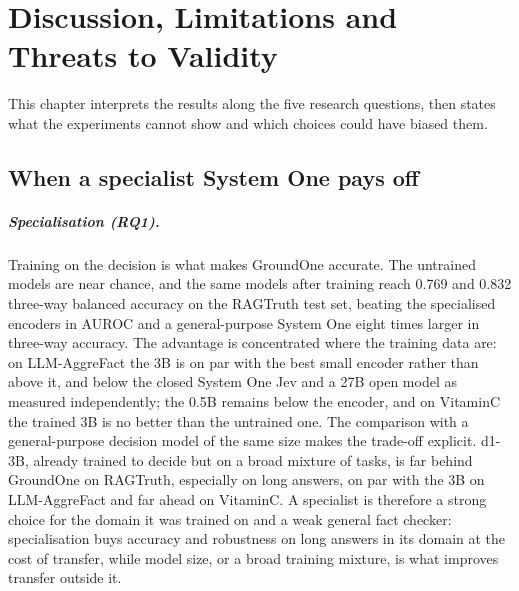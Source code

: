 \chapter{Discussion, Limitations and Threats to Validity}
\label{sec:discussion}


This chapter interprets the results along the five research questions, then states what the experiments cannot show
and which choices could have biased them.

\section{When a specialist System One pays off}
\label{sec:disc-synthesis}

\paragraph{Specialisation (RQ1).} Training on the decision is what makes GroundOne accurate. The untrained models are
near chance, and the same models after training reach 0.769 and 0.832 three-way balanced accuracy on the RAGTruth test
set, beating the specialised encoders in AUROC and a general-purpose System One eight times larger in three-way accuracy.
The advantage is concentrated where the training data are: on LLM-AggreFact the 3B is on par with the best small encoder
rather than above it, and below the closed System One Jev and a 27B open model as measured independently; the 0.5B
remains below the encoder, and on VitaminC the trained 3B is no better than the untrained one. The comparison with a general-purpose decision model of the same size makes the trade-off explicit. d1-3B, already
trained to decide but on a broad mixture of tasks, is far behind GroundOne on RAGTruth, especially on long answers, on par
with the 3B on LLM-AggreFact and far ahead on VitaminC. A specialist is therefore a strong choice for the domain it was
trained on and a weak general fact checker: specialisation buys accuracy and robustness on long answers in its domain at
the cost of transfer, while model size, or a broad training mixture, is what improves transfer outside it.

